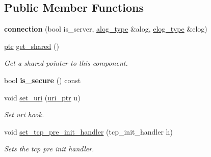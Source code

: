 \subsection*{Public Member Functions}
\begin{DoxyCompactItemize}
\item 
\mbox{\label{classwebsocketpp_1_1transport_1_1asio_1_1connection_aff25718cc376e7d473d4e46c12e22551}} 
{\bfseries connection} (bool is\+\_\+server, \mbox{\hyperlink{classwebsocketpp_1_1transport_1_1asio_1_1connection_a457470621386c06374aa3bd189a4715e}{alog\+\_\+type}} \&alog, \mbox{\hyperlink{classwebsocketpp_1_1transport_1_1asio_1_1connection_a1d2ac8c55817ecadf12be51f49578ca5}{elog\+\_\+type}} \&elog)
\item 
\mbox{\label{classwebsocketpp_1_1transport_1_1asio_1_1connection_ac190efbc8cfd2654bc07b5b9382c36cc}} 
\mbox{\hyperlink{classwebsocketpp_1_1transport_1_1asio_1_1connection_aa6f25556860a154c4dacb4dac1dce8e4}{ptr}} \mbox{\hyperlink{classwebsocketpp_1_1transport_1_1asio_1_1connection_ac190efbc8cfd2654bc07b5b9382c36cc}{get\+\_\+shared}} ()
\begin{DoxyCompactList}\small\item\em Get a shared pointer to this component. \end{DoxyCompactList}\item 
\mbox{\label{classwebsocketpp_1_1transport_1_1asio_1_1connection_aaca175de7022aa0840bad7429c8988fd}} 
bool {\bfseries is\+\_\+secure} () const
\item 
void \mbox{\hyperlink{classwebsocketpp_1_1transport_1_1asio_1_1connection_abe1def82c2be645adfc9f769aafb1a0d}{set\+\_\+uri}} (\mbox{\hyperlink{namespacewebsocketpp_aae370ea5ac83a8ece7712cb39fc23f5b}{uri\+\_\+ptr}} u)
\begin{DoxyCompactList}\small\item\em Set uri hook. \end{DoxyCompactList}\item 
void \mbox{\hyperlink{classwebsocketpp_1_1transport_1_1asio_1_1connection_ac71341129ff5389fa84cd9ef13c8c05e}{set\+\_\+tcp\+\_\+pre\+\_\+init\+\_\+handler}} (tcp\+\_\+init\+\_\+handler h)
\begin{DoxyCompactList}\small\item\em Sets the tcp pre init handler. \end{DoxyCompactList}\item 

\end{DoxyCompactItemize}
